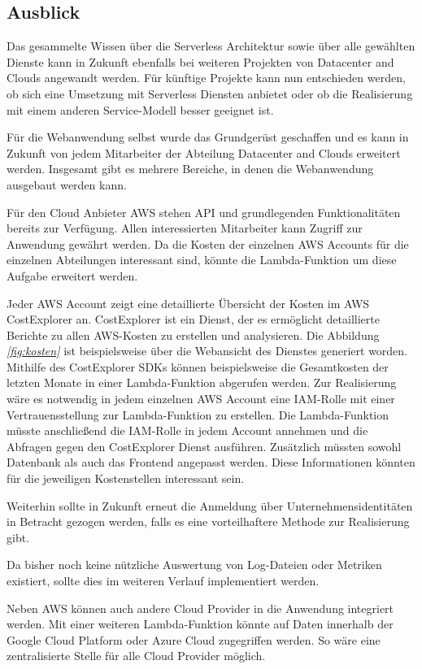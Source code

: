 \subsection{Ausblick}
Das gesammelte Wissen über die Serverless Architektur sowie über alle gewählten Dienste kann in Zukunft ebenfalls bei weiteren Projekten von Datacenter and Clouds angewandt werden.
Für künftige Projekte kann nun entschieden werden, ob sich eine Umsetzung mit Serverless Diensten anbietet oder ob die Realisierung mit einem anderen Service-Modell besser geeignet ist.

Für die Webanwendung selbst wurde das Grundgerüst geschaffen und es kann in Zukunft von jedem Mitarbeiter der Abteilung Datacenter and Clouds erweitert werden.
Insgesamt gibt es mehrere Bereiche, in denen die Webanwendung ausgebaut werden kann.

Für den Cloud Anbieter AWS stehen API und grundlegenden Funktionalitäten bereits zur Verfügung.
Allen interessierten Mitarbeiter kann Zugriff zur Anwendung gewährt werden.
Da die Kosten der einzelnen AWS Accounts für die einzelnen Abteilungen interessant sind, könnte die Lambda-Funktion um diese Aufgabe erweitert werden.

Jeder AWS Account zeigt eine detaillierte Übersicht der Kosten im AWS CostExplorer an.
CostExplorer ist ein Dienst, der es ermöglicht detaillierte Berichte zu allen AWS-Kosten zu erstellen und analysieren.
Die Abbildung \textit{\ref{fig:kosten} } ist beispielsweise über die Webansicht des Dienstes generiert worden.
Mithilfe des CostExplorer SDKs können beispielsweise die Gesamtkosten der letzten Monate in einer Lambda-Funktion abgerufen werden.
Zur Realisierung wäre es notwendig in jedem einzelnen AWS Account eine IAM-Rolle mit einer Vertrauensstellung zur Lambda-Funktion zu erstellen.
Die Lambda-Funktion müsste anschließend die IAM-Rolle in jedem Account annehmen und die Abfragen gegen den CostExplorer Dienst ausführen.
Zusätzlich müssten sowohl Datenbank als auch das Frontend angepasst werden.
Diese Informationen könnten für die jeweiligen Kostenstellen interessant sein.

Weiterhin sollte in Zukunft erneut die Anmeldung über Unternehmensidentitäten in Betracht gezogen werden, falls es eine vorteilhaftere Methode zur Realisierung gibt.

Da bisher noch keine nützliche Auswertung von Log-Dateien oder Metriken existiert, sollte dies im weiteren Verlauf implementiert werden.

Neben AWS können auch andere Cloud Provider in die Anwendung integriert werden.
Mit einer weiteren Lambda-Funktion könnte auf Daten innerhalb der Google Cloud Platform oder Azure Cloud zugegriffen werden.
So wäre eine zentralisierte Stelle für alle Cloud Provider möglich.















